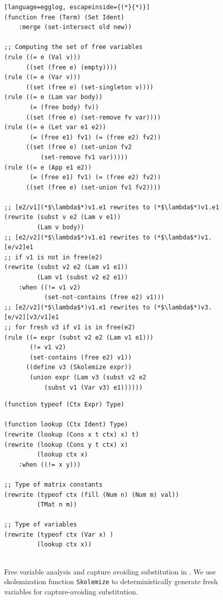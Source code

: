  \begin{figure}
    \begin{minipage}[t]{0.48\linewidth}
\begin{lstlisting}[language=egglog, escapeinside={(*}{*)}]
(function free (Term) (Set Ident)
    :merge (set-intersect old new))

;; Computing the set of free variables
(rule ((= e (Val v)))
      ((set (free e) (empty))))
(rule ((= e (Var v)))
      ((set (free e) (set-singleton v))))
(rule ((= e (Lam var body))
       (= (free body) fv))
      ((set (free e) (set-remove fv var))))
(rule ((= e (Let var e1 e2))
       (= (free e1) fv1) (= (free e2) fv2))
      ((set (free e) (set-union fv2
          (set-remove fv1 var)))))
(rule ((= e (App e1 e2))
       (= (free e1) fv1) (= (free e2) fv2))
      ((set (free e) (set-union fv1 fv2))))

;; [e2/v1](*$\lambda$*)v1.e1 rewrites to (*$\lambda$*)v1.e1
(rewrite (subst v e2 (Lam v e1))
         (Lam v body))
;; [e2/v2](*$\lambda$*)v1.e1 rewrites to (*$\lambda$*)v1.[e/v2]e1
;; if v1 is not in free(e2)
(rewrite (subst v2 e2 (Lam v1 e1))
         (Lam v1 (subst v2 e2 e1))
    :when ((!= v1 v2)
           (set-not-contains (free e2) v1)))
;; [e2/v2](*$\lambda$*)v1.e1 rewrites to (*$\lambda$*)v3.[e/v2][v3/v1]e1
;; for fresh v3 if v1 is in free(e2)
(rule ((= expr (subst v2 e2 (Lam v1 e1)))
       (!= v1 v2)
       (set-contains (free e2) v1))
      ((define v3 (Skolemize expr))
       (union expr (Lam v3 (subst v2 e2
           (subst v1 (Var v3) e1))))))
\end{lstlisting}
\caption{Free variable analysis
 and capture avoiding substitution in \egglog.
We use skolemization function \lstinline{Skolemize}
 to deterministically generate fresh variables
 for capture-avoiding substitution.
}
\label{fig:free-var}
\end{minipage}
\hfill
\begin{minipage}[t]{0.48\linewidth}
\begin{lstlisting}[language=egglog]
(function typeof (Ctx Expr) Type)

(function lookup (Ctx Ident) Type)
(rewrite (lookup (Cons x t ctx) x) t)
(rewrite (lookup (Cons y t ctx) x)
         (lookup ctx x)
    :when ((!= x y)))

;; Type of matrix constants
(rewrite (typeof ctx (fill (Num n) (Num m) val))
         (TMat n m))

;; Type of variables
(rewrite (typeof ctx (Var x) )
         (lookup ctx x))


\end{lstlisting}
\end{minipage}
\end{figure}
